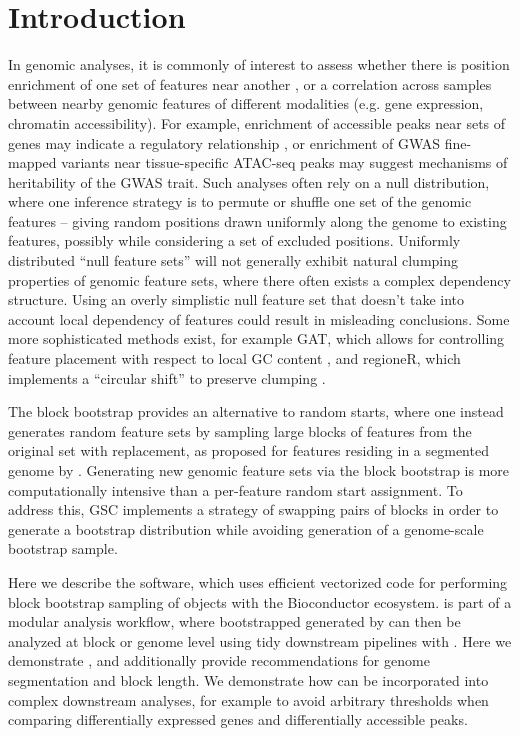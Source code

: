 \section{Introduction}
In genomic analyses, it is commonly of interest to assess whether
there is position enrichment of one set of features near another
\citep{reviewdilemma2014},
or a correlation across samples between nearby genomic features of
different modalities (e.g. gene expression, chromatin accessibility).
For example, enrichment of accessible peaks near sets of genes may
indicate a regulatory relationship \citep{lee2020fluent}, or
enrichment of GWAS fine-mapped variants
near tissue-specific ATAC-seq peaks may suggest
mechanisms of heritability of the GWAS trait.
Such analyses often rely on a null distribution, where one inference
strategy is to permute or shuffle one set of the
genomic features -- giving random positions drawn uniformly along the
genome to existing features, possibly while considering a set of
excluded positions.
Uniformly distributed ``null feature sets'' will not generally exhibit
natural clumping properties of
genomic feature sets, where there often exists a complex
dependency structure.
Using an overly simplistic null feature set that doesn't take into
account local dependency of features could result in misleading
conclusions.
Some more sophisticated methods exist, for example
GAT, which allows for controlling feature placement with
respect to local GC content
\citep{GAT_2013}, and regioneR, which implements a ``circular shift'' to
preserve clumping \citep{gel2016regioner}.

The block bootstrap \citep{politis1999subsampling}
provides an alternative to random starts, where one instead generates
random feature sets by sampling large blocks of features from the
original set with replacement, as proposed for features residing in a
segmented genome by \citet{bickel2010subsampling}.
Generating new genomic feature sets via the block bootstrap is more
computationally intensive than a per-feature random start assignment.
To address this, GSC \citep{bickel2010subsampling} implements a
strategy of swapping pairs of blocks in order to generate a bootstrap
distribution while avoiding generation of a genome-scale bootstrap
sample.

Here we describe the \bootranges software, which uses efficient
vectorized code for performing block bootstrap sampling of
\granges \citep{lawrence2013software} objects with the Bioconductor
ecosystem.
\bootranges is part of a modular analysis workflow, where bootstrapped
\granges generated by \bootranges can then be analyzed at block or
genome level using tidy downstream pipelines with \plyranges
\citep{lee2019plyranges}.
Here we demonstrate \bootranges, and additionally provide
recommendations for genome segmentation and block length.
We demonstrate how \bootranges can be incorporated into complex
downstream analyses, for example to avoid arbitrary thresholds when
comparing differentially expressed genes and differentially accessible
peaks.

